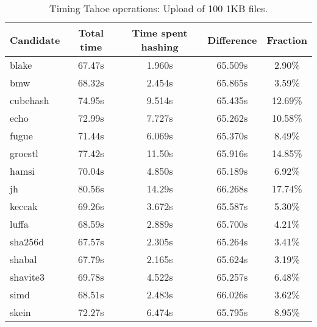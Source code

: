 \begin{table}[h]
  \centering
  \begin{tabular}{ | l | c | c | c | c | }
    \hline
    Candidate & Total time & Time spent hashing & Difference & Fraction \\ \hline
    blake & 67.47s & 1.960s & 65.509s & 2.90\% \\ \hline
    bmw & 68.32s & 2.454s & 65.865s & 3.59\% \\ \hline
    cubehash & 74.95s & 9.514s & 65.435s & 12.69\% \\ \hline
    echo & 72.99s & 7.727s & 65.262s & 10.58\% \\ \hline
    fugue & 71.44s & 6.069s & 65.370s & 8.49\% \\ \hline
    groestl & 77.42s & 11.50s & 65.916s & 14.85\% \\ \hline
    hamsi & 70.04s & 4.850s & 65.189s & 6.92\% \\ \hline
    jh & 80.56s & 14.29s & 66.268s & 17.74\% \\ \hline
    keccak & 69.26s & 3.672s & 65.587s & 5.30\% \\ \hline
    luffa & 68.59s & 2.889s & 65.700s & 4.21\% \\ \hline
    sha256d & 67.57s & 2.305s & 65.264s & 3.41\% \\ \hline
    shabal & 67.79s & 2.165s & 65.624s & 3.19\% \\ \hline
    shavite3 & 69.78s & 4.522s & 65.257s & 6.48\% \\ \hline
    simd & 68.51s & 2.483s & 66.026s & 3.62\% \\ \hline
    skein & 72.27s & 6.474s & 65.795s & 8.95\% \\ \hline
  \end{tabular}
  \caption{Timing Tahoe operations: Upload of 100 1KB files.}
  \label{tbl:hashingtimes:put1kb}
\end{table}

